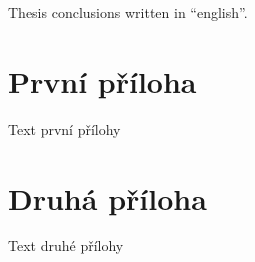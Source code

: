 \documentclass[a4paper,12pt]{article}
\begin{document}
\begin{upconclusions}[english]
Thesis conclusions written in \enquote{english}.
\end{upconclusions}

\upprintabbrevlist

\upprinttheoremlist

\nocite{*}							%
\upprintbibliography

%

\clearpage
\appendix
\section{První příloha}
Text první přílohy

\section{Druhá příloha}
Text druhé přílohy

\upprintindex
\end{document}
